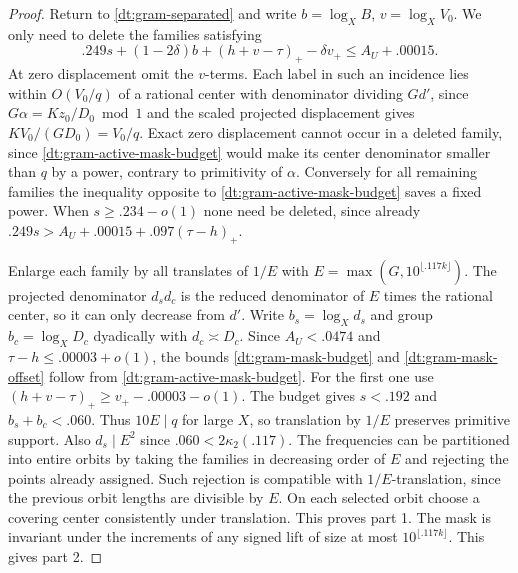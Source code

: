 \documentclass[11pt,a4paper]{article}
\theoremstyle{paperplain}
\numberwithin{equation}{section}
\begin{document}
\begin{proof}
Return to \eqref{dt:gram-separated} and write
\(b=\log_X B\), \(v=\log_X V_0\).
We only need to delete the families satisfying
\begin{equation}
 .249s+(1-2\delta)b+(h+v-\tau)_+-\delta v_+
                                       \le A_U+.00015.
 \label{dt:gram-active-mask-budget}
\end{equation}
At zero displacement omit the \(v\)-terms. Each label
in such an incidence lies within \(O(V_0/q)\) of a
rational center with denominator dividing \(Gd'\),
since \(G\alpha=Kz_0/D_0\bmod1\) and the scaled
projected displacement gives \(KV_0/(GD_0)=V_0/q\).
Exact zero displacement cannot occur in a deleted
family, since \eqref{dt:gram-active-mask-budget} would
make its center denominator smaller than \(q\) by a
power, contrary to primitivity of \(\alpha\).
Conversely for all remaining families the inequality
opposite to \eqref{dt:gram-active-mask-budget} saves a
fixed power. When \(s\ge.234-o(1)\) none need be
deleted, since already \(.249s>A_U+.00015+.097(\tau-h)_+\).

Enlarge each family by all translates of \(1/E\) with
\(E=\max(G,10^{\lfloor.117k\rfloor})\).
The projected denominator \(d_s d_c\) is the reduced
denominator of \(E\) times the rational center, so it
can only decrease from \(d'\). Write
\(b_s=\log_X d_s\) and group \(b_c=\log_X D_c\) dyadically
with \(d_c\asymp D_c\).
Since \(A_U<.0474\) and \(\tau-h\le.00003+o(1)\),
the bounds \eqref{dt:gram-mask-budget} and
\eqref{dt:gram-mask-offset} follow from
\eqref{dt:gram-active-mask-budget}. For the first one
use \((h+v-\tau)_+\ge v_+-.00003-o(1)\).
The budget gives \(s<.192\) and \(b_s+b_c<.060\).
Thus \(10E\mid q\) for large \(X\), so translation by \(1/E\)
preserves primitive support. Also \(d_s\mid E^2\) since
\(.060<2\kappa_2(.117)\).
The frequencies can be partitioned into entire orbits
by taking the families in decreasing order of \(E\)
and rejecting the points already assigned. Such rejection
is compatible with \(1/E\)-translation, since the
previous orbit lengths are divisible by \(E\).
On each selected orbit choose a covering center
consistently under translation. This proves part 1.
The mask is invariant under the increments of any signed
lift of size at most \(10^{\lfloor.117k\rfloor}\).
This gives part 2.


\end{proof}
\end{document}
